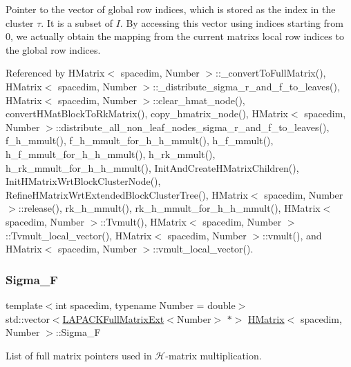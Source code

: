 Pointer to the vector of global row indices, which is stored as the index in the cluster $\tau$. It is a subset of $I$. By accessing this vector using indices starting from 0, we actually obtain the mapping from the current matrix\textquotesingle{}s local row indices to the global row indices. 

Referenced by H\+Matrix$<$ spacedim, Number $>$\+::\+\_\+convert\+To\+Full\+Matrix(), H\+Matrix$<$ spacedim, Number $>$\+::\+\_\+distribute\+\_\+sigma\+\_\+r\+\_\+and\+\_\+f\+\_\+to\+\_\+leaves(), H\+Matrix$<$ spacedim, Number $>$\+::clear\+\_\+hmat\+\_\+node(), convert\+H\+Mat\+Block\+To\+Rk\+Matrix(), copy\+\_\+hmatrix\+\_\+node(), H\+Matrix$<$ spacedim, Number $>$\+::distribute\+\_\+all\+\_\+non\+\_\+leaf\+\_\+nodes\+\_\+sigma\+\_\+r\+\_\+and\+\_\+f\+\_\+to\+\_\+leaves(), f\+\_\+h\+\_\+mmult(), f\+\_\+h\+\_\+mmult\+\_\+for\+\_\+h\+\_\+h\+\_\+mmult(), h\+\_\+f\+\_\+mmult(), h\+\_\+f\+\_\+mmult\+\_\+for\+\_\+h\+\_\+h\+\_\+mmult(), h\+\_\+rk\+\_\+mmult(), h\+\_\+rk\+\_\+mmult\+\_\+for\+\_\+h\+\_\+h\+\_\+mmult(), Init\+And\+Create\+H\+Matrix\+Children(), Init\+H\+Matrix\+Wrt\+Block\+Cluster\+Node(), Refine\+H\+Matrix\+Wrt\+Extended\+Block\+Cluster\+Tree(), H\+Matrix$<$ spacedim, Number $>$\+::release(), rk\+\_\+h\+\_\+mmult(), rk\+\_\+h\+\_\+mmult\+\_\+for\+\_\+h\+\_\+h\+\_\+mmult(), H\+Matrix$<$ spacedim, Number $>$\+::\+Tvmult(), H\+Matrix$<$ spacedim, Number $>$\+::\+Tvmult\+\_\+local\+\_\+vector(), H\+Matrix$<$ spacedim, Number $>$\+::vmult(), and H\+Matrix$<$ spacedim, Number $>$\+::vmult\+\_\+local\+\_\+vector().

\mbox{\label{classHMatrix_aa659b6df63d533432ec1a24435cd9c40}} 
\subsubsection{\texorpdfstring{Sigma\+\_\+F}{Sigma\_F}}
{\footnotesize\ttfamily template$<$int spacedim, typename Number = double$>$ \\
std\+::vector$<$\hyperlink{classLAPACKFullMatrixExt}{L\+A\+P\+A\+C\+K\+Full\+Matrix\+Ext}$<$Number$>$ $\ast$$>$ \hyperlink{classHMatrix}{H\+Matrix}$<$ spacedim, Number $>$\+::Sigma\+\_\+F\hspace{0.3cm}{\ttfamily [private]}}

List of full matrix pointers used in $\mathcal{H}$-\/matrix multiplication. 

